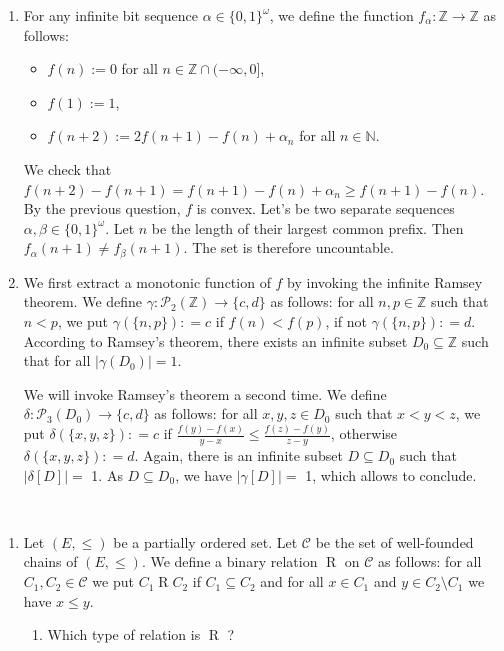 \documentclass[a4paper,11pt]{exam}
\newcommand{\Z}{\mathbb{Z}}
\newcommand{\N}{\mathbb{N}}
\begin{document}
\begin{questions}
\begin{solution}
\begin{enumerate}
				
				\item For any infinite bit sequence $ \alpha \in \{0,1 \}^\omega $, we define the function $ f_\alpha: \Z \to \Z $ as follows:
				\begin{itemize}
					\item $f(n) := 0$ for all $n \in \Z \cap (-\infty,0]$,
					\item $f(1) := 1$,
					\item $f(n+2) := 2f(n+1) - f(n) + \alpha_n$ for all $n \in \N$.
				\end{itemize}
				We check that		
				$f(n+2)-f(n+1) = f(n+1) - f(n) + \alpha_n \geq f(n+1) - f(n)$. By the previous question, $ f $ is convex. Let's be two separate sequences $ \alpha, \beta \in \{0,1 \}^\omega $. Let $ n $ be the length of their largest common prefix. Then $ f_\alpha(n + 1) \neq f_\beta(n + 1) $. The set is therefore uncountable.
				
				\item We first extract a monotonic function of $ f $ by invoking the infinite Ramsey theorem. We define $ \gamma: \mathcal{P}_2 (\Z) \to \{c, d\} $ as follows: for all $ n, p \in \Z $ such that $ n <p $, we put $ \gamma (\{n, p \}): = c$ if $ f(n) <f (p) $, if not $ \gamma (\{n, p \}): = d $. According to Ramsey's theorem, there exists an infinite subset $ D_0 \subseteq \Z $ such that for all $ | \gamma (D_0) | =  1$.
				
				We will invoke Ramsey's theorem a second time. We define $ \delta: \mathcal{P}_3 (D_0) \to \{c, d \} $ as follows: for all $ x, y, z \in D_0 $ such that $ x <y < z $, we put $ \delta (\{x, y, z \}): = c $ if $ \frac{f (y) - f (x)}{y - x} \leq \frac{f ( z) - f (y)}{z-y} $, otherwise $ \delta(\{x, y, z \}): = d $. Again, there is an infinite subset $ D\subseteq D_0 $ such that $ | \delta [D]| = $ 1. As $ D \subseteq D_0 $, we have $ | \gamma [D] | = $ 1, which allows to conclude.
			\end{enumerate}
		\end{solution}
		
		
		
		\question
		\,
		\begin{enumerate}
			\item Let $ (E, \leq) $ be a partially ordered set. Let $ \mathcal{C} $ be the set of well-founded chains of $ (E, \leq) $. We define a binary relation $ \mathrel{R} $ on $ \mathcal{C} $ as follows: for all $ C_1, C_2 \in \mathcal{C} $ we put $ C_1 \mathrel{R} C_2 $ if $ C_1 \subseteq C_2 $ and for all $ x \in C_1 $ and $ y \in C_2 \setminus C_1 $ we have $ x \leq y $.
			\begin{enumerate}
				\item Which type of relation is $\mathrel{R}$ ?
				

\end{enumerate}
\end{enumerate}
\end{questions}
\end{document}
